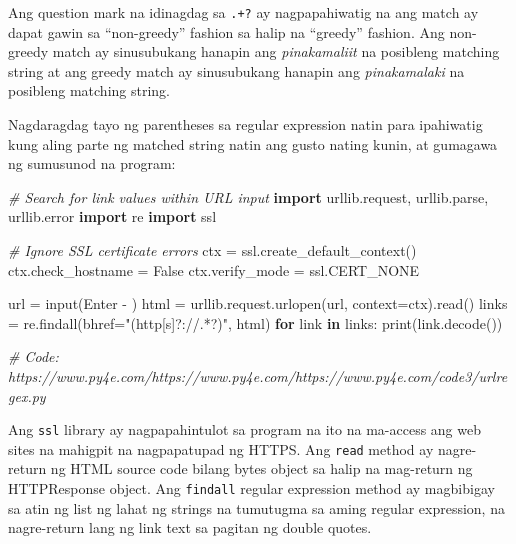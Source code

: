 \documentclass[10pt,]{book}
\newenvironment{Shaded}{}{}
\newcommand{\BuiltInTok}[1]{\textcolor[rgb]{0.00,0.50,0.00}{#1}}
\newcommand{\CommentTok}[1]{\textcolor[rgb]{0.38,0.63,0.69}{\textit{#1}}}
\newcommand{\ControlFlowTok}[1]{\textcolor[rgb]{0.00,0.44,0.13}{\textbf{#1}}}
\newcommand{\ImportTok}[1]{\textcolor[rgb]{0.00,0.50,0.00}{\textbf{#1}}}
\newcommand{\KeywordTok}[1]{\textcolor[rgb]{0.00,0.44,0.13}{\textbf{#1}}}
\newcommand{\NormalTok}[1]{#1}
\newcommand{\OperatorTok}[1]{\textcolor[rgb]{0.40,0.40,0.40}{#1}}
\newcommand{\StringTok}[1]{\textcolor[rgb]{0.25,0.44,0.63}{#1}}
\newcommand{\VariableTok}[1]{\textcolor[rgb]{0.10,0.09,0.49}{#1}}
\begin{document}
Ang question mark na idinagdag sa \texttt{.+?} ay nagpapahiwatig na ang
match ay dapat gawin sa ``non-greedy'' fashion sa halip na ``greedy''
fashion. Ang non-greedy match ay sinusubukang hanapin ang
\emph{pinakamaliit} na posibleng matching string at ang greedy match ay
sinusubukang hanapin ang \emph{pinakamalaki} na posibleng matching
string.

 

Nagdaragdag tayo ng parentheses sa regular expression natin para
ipahiwatig kung aling parte ng matched string natin ang gusto nating
kunin, at gumagawa ng sumusunod na program:

 

\begin{Shaded}
\begin{Highlighting}[]
\CommentTok{\# Search for link values within URL input}
\ImportTok{import}\NormalTok{ urllib.request, urllib.parse, urllib.error}
\ImportTok{import}\NormalTok{ re}
\ImportTok{import}\NormalTok{ ssl}

\CommentTok{\# Ignore SSL certificate errors}
\NormalTok{ctx }\OperatorTok{=}\NormalTok{ ssl.create\_default\_context()}
\NormalTok{ctx.check\_hostname }\OperatorTok{=} \VariableTok{False}
\NormalTok{ctx.verify\_mode }\OperatorTok{=}\NormalTok{ ssl.CERT\_NONE}

\NormalTok{url }\OperatorTok{=} \BuiltInTok{input}\NormalTok{(}\StringTok{\textquotesingle{}Enter {-} \textquotesingle{}}\NormalTok{)}
\NormalTok{html }\OperatorTok{=}\NormalTok{ urllib.request.urlopen(url, context}\OperatorTok{=}\NormalTok{ctx).read()}
\NormalTok{links }\OperatorTok{=}\NormalTok{ re.findall(}\StringTok{b\textquotesingle{}href="(http[s]?://.*?)"\textquotesingle{}}\NormalTok{, html)}
\ControlFlowTok{for}\NormalTok{ link }\KeywordTok{in}\NormalTok{ links:}
    \BuiltInTok{print}\NormalTok{(link.decode())}

\CommentTok{\# Code: https://www.py4e.com/https://www.py4e.com/https://www.py4e.com/code3/urlregex.py}
\end{Highlighting}
\end{Shaded}

Ang \texttt{ssl} library ay nagpapahintulot sa program na ito na
ma-access ang web sites na mahigpit na nagpapatupad ng HTTPS. Ang
\texttt{read} method ay nagre-return ng HTML source code bilang bytes
object sa halip na mag-return ng HTTPResponse object. Ang
\texttt{findall} regular expression method ay magbibigay sa atin ng list
ng lahat ng strings na tumutugma sa aming regular expression, na
nagre-return lang ng link text sa pagitan ng double quotes.
\end{document}
